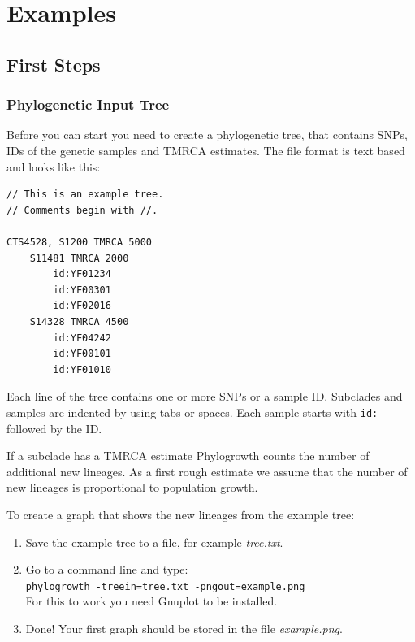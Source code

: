 \section{Examples}

\subsection{First Steps}

\subsubsection*{Phylogenetic Input Tree}

Before you can start you need to create a phylogenetic tree,
that contains SNPs, IDs of the genetic samples and TMRCA
estimates. The file format is text based and looks like this:

\begin{verbatim}
// This is an example tree.
// Comments begin with //.

CTS4528, S1200 TMRCA 5000
    S11481 TMRCA 2000
        id:YF01234
        id:YF00301
        id:YF02016
    S14328 TMRCA 4500
        id:YF04242
        id:YF00101
        id:YF01010
\end{verbatim}

Each line of the tree contains one or more SNPs or a sample
ID. Subclades and samples are indented by using tabs or spaces.
Each sample starts with \texttt{id:} followed by the ID.

If a subclade has a TMRCA estimate Phylogrowth counts the number
of additional new lineages. As a first rough estimate we assume
that the number of new lineages is proportional to population
growth.

To create a graph that shows the new lineages from the example
tree:

\begin{enumerate}
\item Save the example tree to a file, for example \emph{tree.txt}.
\item Go to a command line and type:\\
	\texttt{phylogrowth -treein=tree.txt -pngout=example.png}\\
	For this to work you need Gnuplot \cite{Gnuplot} to be installed.
\item Done! Your first graph should be stored in the file \emph{example.png}.
\end{enumerate}

